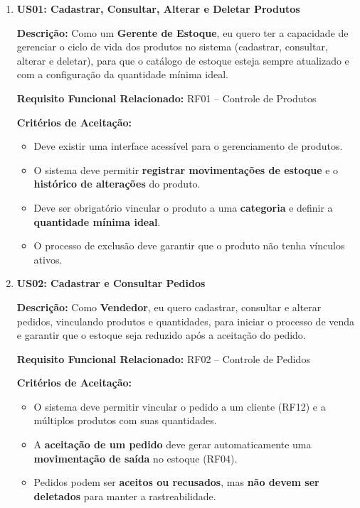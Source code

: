 \documentclass[
	12pt,				%
	openany,			%
	twoside,			%
	a4paper,			%
	english,			%
	brazil				%
	]{abntex2}
\begin{document}
\begin{enumerate}

\item \textbf{US01: Cadastrar, Consultar, Alterar e Deletar Produtos}

\textbf{Descri\c{c}\~ao:} Como um \textbf{Gerente de Estoque}, eu quero ter a capacidade de gerenciar o ciclo de vida dos produtos no sistema (cadastrar, consultar, alterar e deletar), para que o catálogo de estoque esteja sempre atualizado e com a configuração da quantidade mínima ideal.

\textbf{Requisito Funcional Relacionado:} RF01 -- Controle de Produtos

\textbf{Crit\'erios de Aceita\c{c}\~ao:}
\begin{itemize}
  \item Deve existir uma interface acess\'ivel para o gerenciamento de produtos.
  \item O sistema deve permitir \textbf{registrar movimentações de estoque} e o \textbf{histórico de alterações} do produto.
  \item Deve ser obrigatório vincular o produto a uma \textbf{categoria} e definir a \textbf{quantidade mínima ideal}.
  \item O processo de exclusão deve garantir que o produto não tenha vínculos ativos.
\end{itemize}

\item \textbf{US02: Cadastrar e Consultar Pedidos}

\textbf{Descri\c{c}\~ao:} Como \textbf{Vendedor}, eu quero cadastrar, consultar e alterar pedidos, vinculando produtos e quantidades, para iniciar o processo de venda e garantir que o estoque seja reduzido após a aceitação do pedido.

\textbf{Requisito Funcional Relacionado:} RF02 -- Controle de Pedidos

\textbf{Crit\'erios de Aceita\c{c}\~ao:}
\begin{itemize}
  \item O sistema deve permitir vincular o pedido a um cliente (RF12) e a múltiplos produtos com suas quantidades.
  \item A \textbf{aceitação de um pedido} deve gerar automaticamente uma \textbf{movimentação de saída} no estoque (RF04).
  \item Pedidos podem ser \textbf{aceitos ou recusados}, mas \textbf{não devem ser deletados} para manter a rastreabilidade.
\end{itemize}


\end{enumerate}
\end{document}
